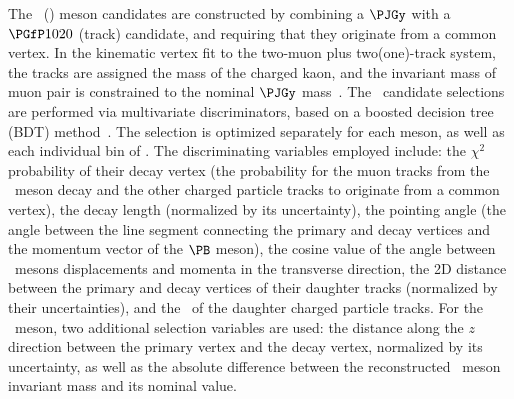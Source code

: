 \documentclass[11pt,twoside,a4paper,cmspaper]{cms-tdr}
\begin{document}
The \PBzs\ (\PBp) meson candidates are constructed by combining a $\PJGy$ with a $\Pphi$ (track) candidate, and requiring that they originate from a common vertex. In the kinematic vertex fit to the two-muon plus two(one)-track system, the tracks are assigned the mass of the charged kaon, and the invariant mass of muon pair is constrained %
to the nominal $\PJGy$ mass~\cite{pdg2018}.
%
%
The \PB\ candidate selections are performed via multivariate discriminators, based on a boosted decision tree (BDT) method~\cite{Hocker:2007ht}. The selection is optimized separately for each meson, as well as each individual bin of \pt. 
%  
The discriminating variables employed include:
the $\chi^{2}$ probability of their decay vertex (the probability for the muon tracks from the \PJGy\ meson decay and the other charged particle tracks to originate from a common vertex), the decay length (normalized by its uncertainty), the pointing angle (the angle between the line segment connecting the primary and decay vertices and the momentum vector of the $\PB$ meson), the cosine value of the angle between \PB\ mesons displacements and momenta in the transverse direction, the 2D distance between the primary and decay vertices of their daughter tracks (normalized by their uncertainties), and the \pt\ of the daughter charged particle tracks. 
%
For the \PBzs\ meson, two additional selection variables are used: 
the distance along the $z$ direction between the primary vertex and the decay 
vertex, normalized by its uncertainty, as well as the absolute difference 
between the reconstructed  \Pphi\ meson invariant mass and its nominal value.

\end{document}
